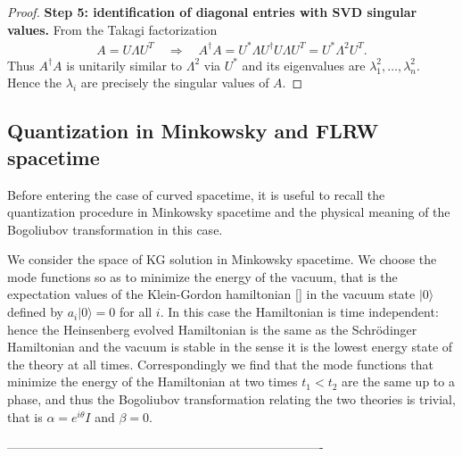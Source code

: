 \documentclass[../QFT_main.tex]{subfiles}
\begin{document}
\begin{proof}
\noindent
\textbf{Step 5: identification of diagonal entries with SVD singular values.}
From the Takagi factorization
\begin{align}
    A = U \Lambda U^T\quad \Rightarrow\quad A^\dagger A = U^* \Lambda U^\dagger U \Lambda U^T = U^* \Lambda^2 U^T.
\end{align}
Thus $A^\dagger A$ is unitarily similar to $\Lambda^2$ via $U^*$ and its eigenvalues are $\lambda_1^2,\dots,\lambda_n^2$. Hence the $\lambda_i$ are precisely the singular values of $A$.
\end{proof}





%
\subsection{Quantization in Minkowsky and FLRW spacetime}

Before entering the case of curved spacetime, it is useful to recall the quantization procedure in Minkowsky spacetime and the physical meaning of the Bogoliubov transformation in this case.

\begin{mytheorem}
We consider the space of KG solution in Minkowsky spacetime.
We choose the mode functions so as to minimize the energy of the vacuum, that is the expectation values of the Klein-Gordon hamiltonian \eqref{} in the vacuum state $|0\rangle$ defined by $a_i |0\rangle = 0$ for all $i$.
In this case the Hamiltonian is time independent: hence the Heinsenberg evolved Hamiltonian is the same as the Schr\"odinger Hamiltonian and the vacuum is stable in the sense it is the lowest energy state of the theory at all times.
Correspondingly we find that the mode functions that minimize the energy of the Hamiltonian at two times $t_1<t_2$ are the same up to a phase, and thus the Bogoliubov transformation relating the two theories is trivial, that is $\alpha = e^{i\theta} I$ and $\beta=0$.
\end{mytheorem}
----------------------------------------------------------------------------
\bigskip
\end{document}
